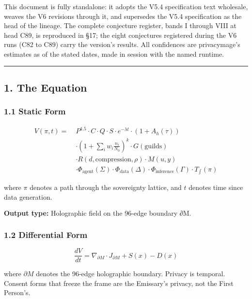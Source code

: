 \documentclass[
  11pt,
]{article}
\begin{document}
This document is fully standalone: it adopts the V5.4 specification text
wholesale, weaves the V6 revisions through it, and supersedes the V5.4
specification as the head of the lineage. The complete conjecture
register, bands I through VIII at head C89, is reproduced in §17; the
eight conjectures registered during the V6 runs (C82 to C89) carry the
version's results. All confidences are privacymage's estimates as of the
stated dates, made in session with the named runtime.

\begin{center}\rule{0.5\linewidth}{0.5pt}\end{center}

\subsection{1. The Equation}\label{the-equation}

\subsubsection{1.1 Static Form}\label{static-form}

\[\begin{aligned}
V(\pi, t) = \; & P^{1.5} \cdot C \cdot Q \cdot S \cdot e^{-\lambda t} \cdot (1 + A_h(\tau)) \\
& \cdot \left(1 + \sum_i w_i \frac{n_i}{N_0}\right)^{k} \cdot G(\text{guilds}) \\
& \cdot R(d, \text{compression}, \rho) \cdot M(u, y) \\
& \cdot \Phi_{\text{agent}}(\Sigma) \cdot \Phi_{\text{data}}(\Delta) \cdot \Phi_{\text{inference}}(\Gamma) \cdot T_{\int}(\pi)
\end{aligned}\]

where \(\pi\) denotes a path through the sovereignty lattice, and \(t\)
denotes time since data generation.

\textbf{Output type:} Holographic field on the 96-edge boundary ∂M.

\subsubsection{1.2 Differential Form}\label{differential-form}

\[\frac{dV}{dt} = \nabla_{\partial M} \cdot J_{\partial M} + S(x) - D(x)\]

where \(\partial M\) denotes the 96-edge holographic boundary. Privacy
is temporal. Consent forms that freeze the frame are the Emissary's
privacy, not the First Person's.
\end{document}
